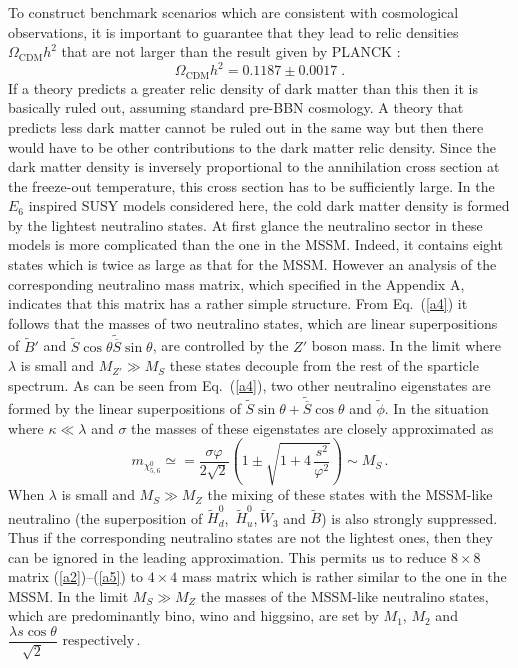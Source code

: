 \documentclass[12pt,a4paper]{article}
\newcommand{\be}{\begin{equation}}
\newcommand{\ee}{\end{equation}}
\begin{document}
To construct benchmark scenarios which are consistent with cosmological observations,
 it is important to guarantee that
they lead to relic densities $\Omega_{\mathrm{CDM}} h^2$ that are not larger than the result given by PLANCK \cite{Ade:2013zuv}:
\be
\Omega_{\mathrm{CDM}} h^2 = 0.1187 \pm 0.0017 \;.
\label{hd32}
\ee
If a theory predicts a greater relic density of dark matter than this then it is basically ruled out, assuming standard pre-BBN
cosmology. A theory that predicts less dark matter cannot be ruled out in the same way but then there would have to be
other contributions to the dark matter relic density. Since the dark matter density is inversely proportional to the annihilation
cross section at the freeze-out temperature, this cross section has to be sufficiently large. In the $E_6$ inspired SUSY models considered here, the cold dark matter 
density is formed by the lightest neutralino states. At first glance
the neutralino sector in these models is more complicated than the one in the MSSM. Indeed, it contains eight states which is
twice as large as that for the MSSM. However an analysis of the corresponding 
neutralino mass matrix, which specified in the Appendix A,
indicates that this matrix has a rather simple structure. 
From Eq.~(\ref{a4}) it follows that the masses of two neutralino states,
which are linear superpositions of $\tilde{B}'$ and 
$\tilde{S}\cos\theta\tilde{\overline{S}}\sin\theta$, are controlled by
the $Z'$ boson mass. In the limit where $\lambda$ is small and $M_{Z'}\gg M_S$ these
 states decouple from the rest of the
sparticle spectrum. As can be seen from Eq.~(\ref{a4}), two other neutralino 
eigenstates are formed by the linear superpositions of
$\tilde{S}\sin\theta+\tilde{\overline{S}}\cos\theta$ and $\tilde{\phi}$. In the 
situation where $\kappa\ll \lambda$ and $\sigma$
the masses of these eigenstates are closely approximated as
\be
m_{\chi^0_{5,6}}\simeq = \dfrac{\sigma\varphi}{2\sqrt{2}}\left(1 \pm \sqrt{1+4\,\dfrac{s^2}{\varphi^2}}\right)\sim M_S\,.
\label{hd33}
\ee
When $\lambda$ is small and $M_S\gg M_Z$  the mixing of these states with the MSSM-like neutralino (the superposition of $\tilde{H}^0_d$,\,
$\tilde{H}^0_u$,\,$\tilde{W}_3$ and $\tilde{B}$) is also strongly suppressed. 
Thus if the corresponding neutralino states are
not the lightest ones, then they can be ignored in the leading approximation. This permits us to reduce $8\times 8$ matrix
(\ref{a2})--(\ref{a5}) to $4\times 4$ mass matrix which is rather similar to the one in the MSSM. In the limit  $M_S\gg M_Z$
the masses of the MSSM-like neutralino states, which are predominantly bino, wino and higgsino, are set by $M_1$, $M_2$
and $\dfrac{\lambda s \cos\theta}{\sqrt{2}}$ respectively\,.
\end{document}
